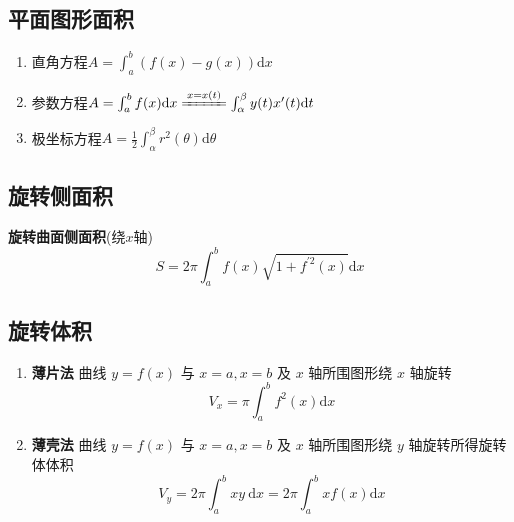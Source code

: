 \documentclass{article}
\begin{document}
		\subsection{平面图形面积}
			\begin{enumerate}
				\item 直角方程$A=\int_{a}^{b}(f(x)-g(x)) \mathrm{d} x$
				\item 参数方程$A=\int_{a}^{b} f(x) \mathrm{d} x \xlongequal{x=x(t)} \int_{\alpha}^{\beta} y(t) x^{\prime}(t) \mathrm{d} t$
				\item 极坐标方程$A=\frac{1}{2} \int_{\alpha}^{\beta} r^{2}(\theta) \mathrm{d} \theta$
			\end{enumerate}
		\subsection{旋转侧面积}
			\textbf{旋转曲面侧面积}(绕$x$轴)
			$$
			S=2 \pi \int_{a}^{b} f(x) \sqrt{1+f^{\prime 2}(x)} \mathrm{d} x
			$$
		\subsection{旋转体积}
		\begin{enumerate}
			\item \textbf{薄片法} 曲线 $y=f(x)$ 与 $x=a, x=b$ 及 $x$ 轴所围图形绕 $x$ 轴旋转
			$$
			V_{x}=\pi \int_{a}^{b} f^{2}(x) \mathrm{d} x
			$$
			\item \textbf{薄壳法} 曲线 $y=f(x)$ 与 $x=a, x=b$ 及 $x$ 轴所围图形绕 $y$ 轴旋转所得旋转体体积
			$$
			V_{y}=2 \pi \int_{a}^{b} x y \mathrm{~d} x=2 \pi \int_{a}^{b} x f(x) \mathrm{d} x
			$$
		\end{enumerate}
\end{document}
